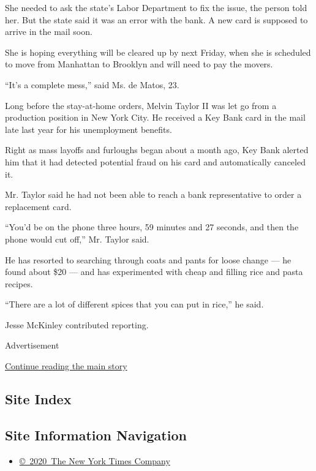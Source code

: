 She needed to ask the state's Labor Department to fix the issue, the
person told her. But the state said it was an error with the bank. A new
card is supposed to arrive in the mail soon.

She is hoping everything will be cleared up by next Friday, when she is
scheduled to move from Manhattan to Brooklyn and will need to pay the
movers.

``It's a complete mess,'' said Ms. de Matos, 23.

Long before the stay-at-home orders, Melvin Taylor II was let go from a
production position in New York City. He received a Key Bank card in the
mail late last year for his unemployment benefits.

Right as mass layoffs and furloughs began about a month ago, Key Bank
alerted him that it had detected potential fraud on his card and
automatically canceled it.

Mr. Taylor said he had not been able to reach a bank representative to
order a replacement card.

``You'd be on the phone three hours, 59 minutes and 27 seconds, and then
the phone would cut off,'' Mr. Taylor said.

He has resorted to searching through coats and pants for loose change
--- he found about \$20 --- and has experimented with cheap and filling
rice and pasta recipes.

``There are a lot of different spices that you can put in rice,'' he
said.

Jesse McKinley contributed reporting.

Advertisement

\protect\hyperlink{after-bottom}{Continue reading the main story}

\hypertarget{site-index}{%
\subsection{Site Index}\label{site-index}}

\hypertarget{site-information-navigation}{%
\subsection{Site Information
Navigation}\label{site-information-navigation}}

\begin{itemize}
\tightlist
\item
  \href{https://help.nytimes3xbfgragh.onion/hc/en-us/articles/115014792127-Copyright-notice}{©~2020~The
  New York Times Company}
\end{itemize}

